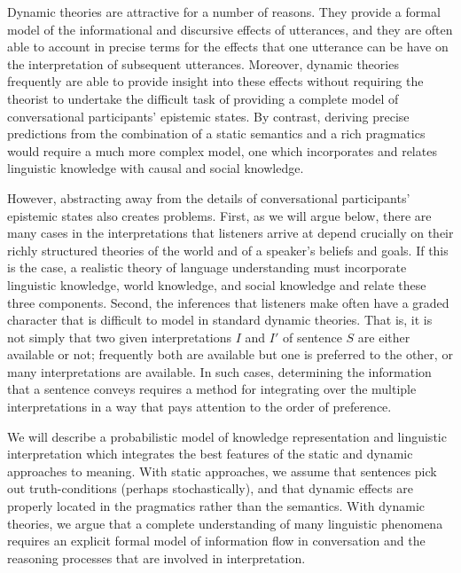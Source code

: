 \documentclass[12pt]{article}
\begin{document}
Dynamic theories are attractive for a number of reasons. They provide a formal model of the informational and discursive effects of utterances, and they are often able to account in precise terms for the effects that one utterance can be have on the interpretation of subsequent utterances. Moreover, dynamic theories frequently are able to provide insight into these effects without requiring the theorist to undertake the difficult task of providing a complete model of conversational participants' epistemic states. By contrast, deriving precise predictions from the combination of a static semantics and a rich pragmatics would require a much more complex model, one which incorporates and relates linguistic knowledge with causal and social knowledge.

However, abstracting away from the details of conversational participants' epistemic states also creates problems. First, as we will argue below, there are many cases in the interpretations that listeners arrive at depend crucially on their richly structured theories of the world and of a speaker's beliefs and goals. If this is the case, a realistic theory of language understanding must incorporate linguistic knowledge, world knowledge, and social knowledge and relate these three components. Second, the inferences that listeners make often have a graded character that is difficult to model in standard dynamic theories. That is, it is not simply that two given interpretations $I$ and $I'$ of sentence $S$ are either available or not; frequently both are available but one is preferred to the other, or many interpretations are available. In such cases, determining the information that a sentence conveys requires a method for integrating over the multiple interpretations in a way that pays attention to the order of preference. 

We will describe a probabilistic model of knowledge representation and linguistic interpretation which integrates the best features of the static and dynamic approaches to meaning. With static approaches, we assume that sentences pick out truth-conditions (perhaps stochastically), and that dynamic effects are properly located in the pragmatics rather than the semantics. With dynamic theories, we argue that a complete understanding of many linguistic phenomena requires an explicit formal model of information flow in conversation and the reasoning processes that are involved in interpretation. 
\end{document}
